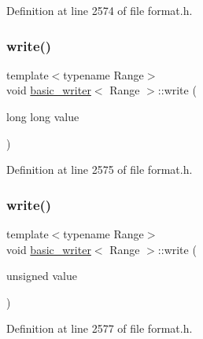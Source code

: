 Definition at line 2574 of file format.\+h.

\mbox{\label{classbasic__writer_a928529c6c90018e60784c3ecd0a01aee}} 
\subsubsection{\texorpdfstring{write()}{write()}\hspace{0.1cm}{\footnotesize\ttfamily [3/16]}}
{\footnotesize\ttfamily template$<$typename Range$>$ \\
void \hyperlink{classbasic__writer}{basic\+\_\+writer}$<$ Range $>$\+::write (\begin{DoxyParamCaption}\item[{long long}]{value }\end{DoxyParamCaption})\hspace{0.3cm}{\ttfamily [inline]}}



Definition at line 2575 of file format.\+h.

\mbox{\label{classbasic__writer_adb334d561ee8eaa8cddf802474df5f61}} 
\subsubsection{\texorpdfstring{write()}{write()}\hspace{0.1cm}{\footnotesize\ttfamily [4/16]}}
{\footnotesize\ttfamily template$<$typename Range$>$ \\
void \hyperlink{classbasic__writer}{basic\+\_\+writer}$<$ Range $>$\+::write (\begin{DoxyParamCaption}\item[{unsigned}]{value }\end{DoxyParamCaption})\hspace{0.3cm}{\ttfamily [inline]}}



Definition at line 2577 of file format.\+h.

\mbox{\label{classbasic__writer_a06f88cd4866e68b27bf64c96ec8582c4}} 
